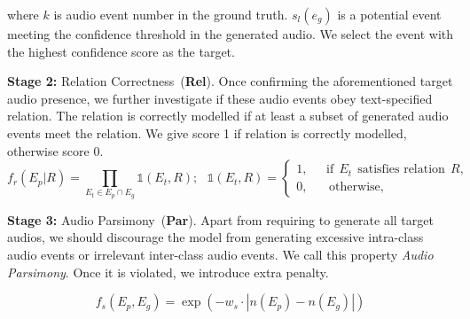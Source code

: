 \noindent where $k$ is audio event number in the ground truth. $s_l(e_g)$ is a potential event meeting the confidence threshold in the generated audio. We select the event with the highest confidence score as the target.

\textbf{Stage 2:} Relation Correctness~(\textbf{Rel}). Once confirming the aforementioned target audio presence, we further investigate if these audio events obey text-specified relation. The relation is correctly modelled if at least a subset of generated audio events meet the relation. We give score 1 if relation is correctly modelled, otherwise score 0.
\begin{equation}
    f_r(E_p|R) = \prod_{E_t \in E_p \cap E_g} \mathds{1}(E_t,R);\ \ \ 
    \mathds{1}(E_t,R) = \left\{
    \begin{aligned}
        1,&\ \ \  \text{if}\ \ E_t \ \ \text{satisfies relation} \ \ R, \\
        0,& \ \ \ \ \text{otherwise},
    \end{aligned}
    \right.
\label{eqn:eval_relation}
\end{equation}

\textbf{Stage 3:} Audio Parsimony~(\textbf{Par}). Apart from requiring to generate all target audios, we should discourage the model from generating excessive intra-class audio events or irrelevant inter-class audio events. We call this property \textit{Audio Parsimony}. Once it is violated, we introduce extra penalty.

\begin{equation}
    f_s(E_p, E_g) = \exp{(-w_s\cdot|n(E_p) - n(E_g)|)}
\label{eqn:eval_parsimony}
\end{equation}

